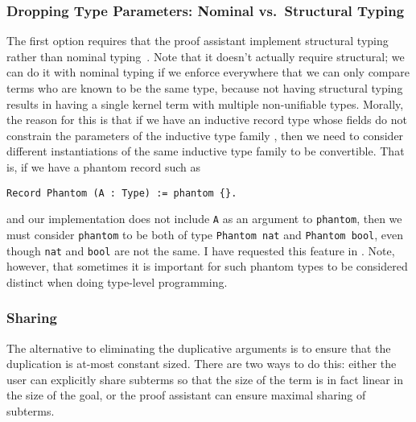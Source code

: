 \subsubsection{Dropping Type Parameters: Nominal vs.~Structural Typing} \label{sec:nominal-vs-structural} \label{sec:dropping-constructor-parameters}
The first option requires that the proof assistant implement structural typing rather than nominal typing~\cite[19.3 Nominal and Structural Type Systems]{tapl}.
Note that it doesn't actually require structural; we can do it with nominal typing if we enforce everywhere that we can only compare terms who are known to be the same type, because not having structural typing results in having a single kernel term with multiple non-unifiable types.
Morally, the reason for this is that if we have an inductive record type   whose fields do not constrain the parameters of the inductive type family , then we need to consider different instantiations of the same inductive type family to be convertible.
That is, if we have a phantom record such as
\begin{verbatim}
Record Phantom (A : Type) := phantom {}.
\end{verbatim}
and our implementation does not include \texttt{A} as an argument to \texttt{phantom}, then we must consider \texttt{phantom} to be both of type \texttt{Phantom nat} and \texttt{Phantom bool}, even though \texttt{nat} and \texttt{bool} are not the same.
I have requested this feature in \cite{https://github.com/coq/coq/issues/5293}.
Note, however, that sometimes it is important for such phantom types to be considered distinct when doing type-level programming.

\subsubsection{Sharing} \label{sec:sharing}
The alternative to eliminating the duplicative arguments is to ensure that the duplication is at-most constant sized.
There are two ways to do this: either the user can explicitly share subterms so that the size of the term is in fact linear in the size of the goal, or the proof assistant can ensure maximal sharing of subterms.

